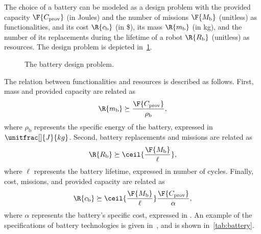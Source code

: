 \begin{example}
The choice of a battery can be modeled as a design problem with the provided capacity $\F{C_\mathrm{prov}}$ (in \unit[]{Joules}) and the number of missions $\F{M_\mathrm{b}}$ (unitless) as functionalities, and its cost $\R{c_\mathrm{b}}$ (in \unit[]{\$}), its mass $\R{m_\mathrm{b}}$ (in \unit[]{kg}), and the number of its replacements during the lifetime of a robot $\R{R_\mathrm{b}}$ (unitless) as resources. The design problem is depicted in~\cref{fig:battery}. 

\begin{figure}[tbh]
\begin{center}
\end{center}
\caption{The battery design problem.\label{fig:battery}}
\end{figure}

The relation between functionalities and resources is described as follows. First, mass and provided capacity are related as
\begin{equation}
    \R{m_\mathrm{b}}\succeq \frac{\F{C_\mathrm{prov}}}{\rho_\mathrm{b}},
\end{equation}
where $\rho_\mathrm{b}$ represents the specific energy of the battery, expressed in $\unitfrac[]{J}{kg}$. Second, battery replacements and missions are related as
\begin{equation}
    \R{R_\mathrm{b}}\succeq \ceil{\frac{\F{M_\mathrm{b}}}{\ell}},
\end{equation}
where $\ell$ represents the battery lifetime, expressed in number of cycles. Finally, cost, missions, and provided capacity are related as
\begin{equation}
    \R{c_\mathrm{b}}\succeq  \ceil{\frac{\F{M_\mathrm{b}}}{\ell}} \frac{\F{C_\mathrm{prov}}}{\alpha},
\end{equation}
where $\alpha$ represents the battery's specific cost, expressed in . An example of the specifications of battery technologies is given in~\cite{censi2015}, and is shown in~\cref{tab:battery}.


\end{example}
